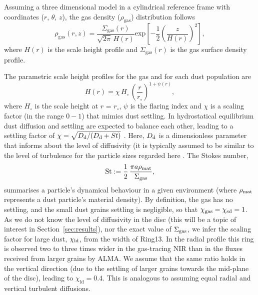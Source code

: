 \documentclass[fleqn,usenatbib,useAMS]{mnras}
\begin{document}
Assuming a three dimensional model in a cylindrical reference frame with coordinates ($r$, $\theta$, $z$), the gas density ($\rho_{\mathrm{gas}}$) distribution follows
\begin{equation}
  \rho_{\mathrm{gas}}(r,z) =\frac{\Sigma_{\mathrm{gas}}(r)}{\sqrt{2\pi} \, H(r)} \mathrm{exp}\left[-\frac{1}{2} \left(\frac{z}{H(r)}\right)^2\right],
\end{equation}
where $H(r)$ is the scale height profile and $\Sigma_{\mathrm{gas}}(r)$ is the gas surface density profile.

The parametric scale height profiles for the gas and for each dust population are 
\begin{equation}
    \label{scale}
  H(r)=\chi \, H_{\circ} \,\left( \frac{r}{r_{\circ}}\right)^{1+\psi(r)},
\end{equation}
where $H_\circ$ is the scale height at $r$ = $r_\circ$, $\psi$ is the flaring index and $\chi$ is a scaling factor (in the range $0-1$) that mimics dust settling. In hydrostatical equilibrium dust diffusion and settling are expected to balance each other, leading to a settling factor of $\chi = \sqrt{D_{\rm d}/(D_{\rm d} + St)}$ \citep{Dubrulle1995}. Here, $D_{\rm d}$ is a dimensionless parameter that informs about the level of diffusivity (it is typically assumed to be similar to the level of turbulence for the particle sizes regarded here \citep{2007Icar..192..588Y}. The Stokes number,
\begin{equation}
    {\rm St} := \frac{1}{2} \,\frac{\pi a \rho_{\rm mat}}{\Sigma_{\rm gas}}, 
\end{equation}
summarises a particle's dynamical behaviour in a given environment (where $\rho_{\rm mat}$ represents a dust particle's material density). By definition, the gas has no settling, and the small dust grains settling is negligible, so that $\chi_{\rm gas}=\chi_{\rm sd}=1$. As we do not know the level of diffusivity in the disc (this will be a topic of interest in Section~\ref{sec:results}), nor the exact value of $\Sigma_{\rm gas}$, we infer the scaling factor for large dust, $\chi_{\rm ld}$, from the width of Ring13. In the radial profile this ring is observed two to three times wider in the gas-tracing NIR than in the fluxes received from larger grains by ALMA. We assume that the same ratio holds in the vertical direction (due to the settling of larger grains towards the mid-plane of the disc), leading to $\chi_{\mathrm{ld}}=0.4$. This is analogous to assuming equal radial and vertical turbulent diffusions.
\end{document}
